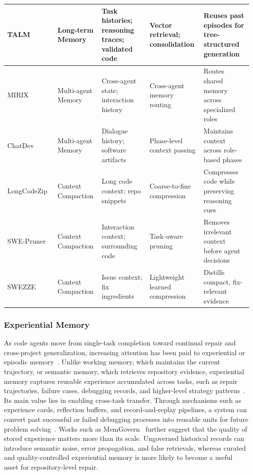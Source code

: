 \begin{table}[t!]
\begin{tabularx}{\textwidth}{p{2.35cm}p{2.5cm}p{3.2cm}p{2.8cm}X}
TALM~\cite{shen2025talm}
& Long-term Memory 
& Task histories; reasoning traces; validated code
& Vector retrieval; consolidation
& Reuses past episodes for tree-structured generation \\
\midrule

MIRIX~\cite{wang2025mirix} 
& Multi-agent Memory 
& Cross-agent state; interaction history
& Cross-agent memory routing 
& Routes shared memory across specialized roles \\

ChatDev~\cite{qian2024chatdev}
& Multi-agent Memory 
& Dialogue history; software artifacts
& Phase-level context passing
& Maintains context across role-based phases \\
\midrule

LongCodeZip~\cite{shi2025longcodezip} 
& Context Compaction
& Long code context; repo snippets
& Coarse-to-fine compression
& Compresses code while preserving reasoning cues \\

SWE-Pruner~\cite{wang2026swe} 
& Context Compaction
& Interaction context; surrounding code
& Task-aware pruning
& Removes irrelevant context before agent decisions \\

SWEZZE~\cite{jia2026compressing} 
& Context Compaction
& Issue context; fix ingredients
& Lightweight learned compression
& Distills compact, fix-relevant evidence \\
\bottomrule
\end{tabularx}
\label{tab:memory_modules}
\end{table}




\subsubsection{Experiential Memory}
As code agents move from single-task completion toward continual repair and cross-project generalization, increasing attention has been paid to experiential or episodic memory~\cite{dong2025towards,huet2025episodic}. Unlike working memory, which maintains the current trajectory, or semantic memory, which retrieves repository evidence, experiential memory captures reusable experience accumulated across tasks, such as repair trajectories, failure cases, debugging records, and higher-level strategy patterns~\cite{zhao2024expel,wei2025evo,liang2026generalizable}. Its main value lies in enabling cross-task transfer. Through mechanisms such as experience cards, reflection buffers, and record-and-replay pipelines, a system can convert past successful or failed debugging processes into reusable units for future problem solving~\cite{wei2025evo,wang2026memgovern,chu2024leveraging}. 
Works such as MemGovern~\cite{wang2026memgovern} further suggest that the quality of stored experience matters more than its scale. Ungoverned historical records can introduce semantic noise, error propagation, and false retrievals, whereas curated and quality-controlled experiential memory is more likely to become a useful asset for repository-level repair.



